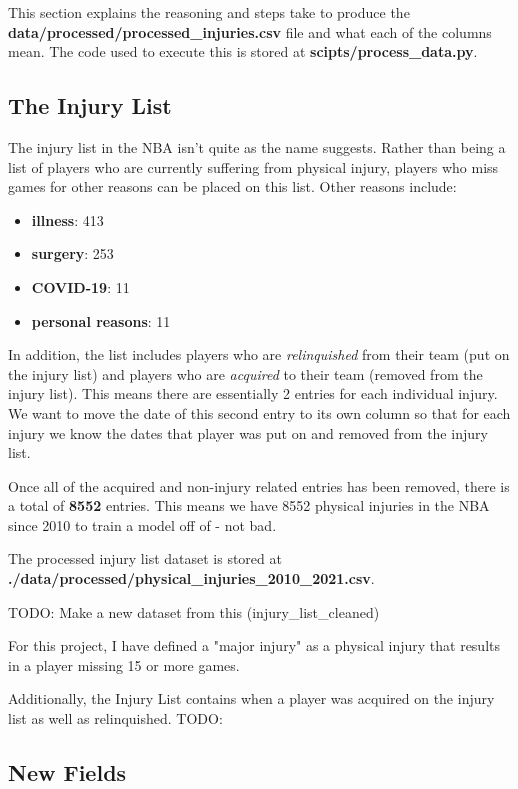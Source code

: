 \documentclass{article}
\begin{document}
This section explains the reasoning and steps take to produce the \textbf{data/processed/processed\_injuries.csv}
file and what each of the columns mean. The code used to execute this is stored at 
\textbf{scipts/process\_data.py}.

\subsection*{The Injury List}

The injury list in the NBA isn't quite as the name suggests. Rather than being a list
of players who are currently suffering from physical injury, players who miss games
for other reasons can be placed on this list. Other reasons include:

\begin{itemize}
    \item \textbf{illness}: 413
    \item \textbf{surgery}: 253
    \item \textbf{COVID-19}: 11
    \item \textbf{personal reasons}: 11
\end{itemize}

In addition, the list includes players who are \emph{relinquished} from their team 
(put on the injury list) and players who are \emph{acquired} to their team (removed
from the injury list). This means there are essentially 2 entries for 
each individual injury. We want to move the date of this second entry to its own column
so that for each injury we know the dates that player was put on and removed from the 
injury list.

Once all of the acquired and non-injury related entries has been removed,
there is a total of \textbf{8552} entries. This means we have 8552
physical injuries in the NBA since 2010 to train a model off of - not bad.

The processed injury list dataset is stored at \textbf{./data/processed/physical\_injuries\_2010\_2021.csv}.

TODO: Make a new dataset from this (injury\_list\_cleaned)

For this project, I have defined a "major injury" as a physical injury that 
results in a player missing 15 or more games.

Additionally, the Injury List contains when a player was acquired on the injury list
as well as relinquished. TODO:

\subsection*{New Fields}
\end{document}
